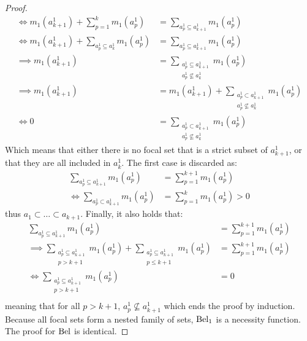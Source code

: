 \begin{proof}
\begin{align*}
        \Leftrightarrow m_1(a^1_{k+1}) + \sum_{p=1}^{k} m_1(a^1_p) &= \sum_{a^1_p\subseteq a^1_{k+1}}m_1(a^1_p)\\
        \Leftrightarrow m_1(a^1_{k+1}) + \sum_{a^1_p\subseteq a^1_k} m_1(a^1_p) &= \sum_{a^1_p\subseteq a^1_{k+1}}m_1(a^1_p)\\
        \implies m_1(a^1_{k+1}) &= \sum_{\substack{a^1_p\subseteq a^1_{k+1} \\ a^1_p\not\subseteq a^1_k}} m_1(a^1_p)\\
        \implies m_1(a^1_{k+1}) &= m_1(a^1_{k+1}) + \sum_{\substack{a^1_p\subset a^1_{k+1} \\ a^1_p\not\subseteq a^1_k}} m_1(a^1_p)\\
        \Leftrightarrow 0 &= \sum_{\substack{a^1_p\subset a^1_{k+1} \\ a^1_p\not\subseteq a^1_k}} m_1(a^1_p)
    \end{align*}
    Which means that either there is no focal set that is a strict subset of $a^1_{k+1}$, or that they are all included in $a^1_{k}$. The first case is discarded as:
    \begin{align*}
        \sum_{a^1_p\subseteq a^1_{k+1}}m_1(a^1_p) &= \sum_{p=1}^{k+1}m_1(a^1_p)\\
        \Leftrightarrow \sum_{a^1_p\subset a^1_{k+1}}m_1(a^1_p) &= \sum_{p=1}^{k}m_1(a^1_p)>0
    \end{align*}
    thus $a_1\subset\dots\subset a_{k+1}$.
    Finally, it also holds that:
    \begin{align*}
        \sum_{a^1_p\subseteq a^1_{k+1}}m_1(a^1_p) &= \sum_{p=1}^{k+1}m_1(a^1_p)\\
        \implies \sum_{\substack{a^1_p\subseteq a^1_{k+1} \\ p>k+1}} m_1(a^1_p) + \sum_{\substack{a^1_p\subseteq a^1_{k+1} \\ p\leqslant k+1}} m_1(a^1_p) &= \sum_{p=1}^{k+1}m_1(a^1_p)\\
        \Leftrightarrow \sum_{\substack{a^1_p\subseteq a^1_{k+1} \\ p>k+1}} m_1(a^1_p) &= 0\\
    \end{align*}
    meaning that for all $p>k+1$, $a^1_p\not\subseteq a^1_{k+1}$ which ends the proof by induction. Because all focal sets form a nested family of sets, $\mathrm{Bel}_1$ is a necessity function. The proof for $\mathrm{Bel} $ is identical. 
\end{proof}

